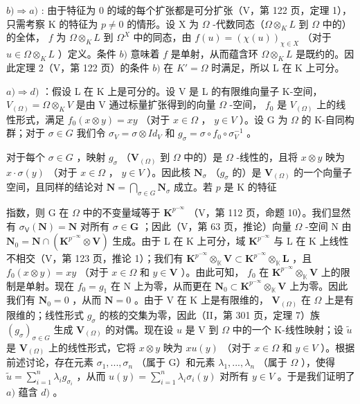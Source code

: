 \(b) \Rightarrow a)\) : 由于特征为 0 的域的每个扩张都是可分扩张（V，第 122 页，定理 1），只需考察 K 的特征为 \(p \neq 0\) 的情形。设 X 为 \(\Omega\) -代数同态（\(\Omega \otimes_{K} L\) 到 \(\Omega\) 中的）的全体， \(f\) 为 \(\Omega \otimes_{K} L\) 到 \(\Omega^{X}\) 中的同态，由 \(f(u) = (\chi(u))_{\chi \in X}\) （对于 \(u \in \Omega \otimes_{K} L\) ）定义。条件 \(b)\) 意味着 \(f\) 是单射，从而蕴含环 \(\Omega \otimes_{K} L\) 是既约的。因此定理 2（V，第 122 页）的条件 \(b)\) 在 \(K' = \Omega\) 时满足，所以 L 在 K 上可分。

\(a) \Rightarrow d)\) ：假设 L 在 K 上是可分的。设 V 是 L 的有限维向量子 K-空间， \(V_{(\Omega)} = \Omega \otimes_K V\) 是由 V 通过标量扩张得到的向量 \(\Omega\) -空间， \(f_0\) 是 \(V_{(\Omega)}\) 上的线性形式，满足 \(f_0(x \otimes y) = xy\) （对于 \(x \in \Omega\) ， \(y \in V\) ）。设 G 为 \(\Omega\) 的 K-自同构群；对于 \(\sigma \in G\) 我们令 \(\sigma_V = \sigma \otimes Id_V\) 和 \(g_\sigma = \sigma \circ f_0 \circ \sigma_V^{-1}\) 。

对于每个 \(\sigma \in G\) ，映射 \(g_{\sigma}\) （\(\mathbf{V}_{(\Omega)}\) 到 \(\Omega\) 中的）是 \(\Omega\) -线性的，且将 \(x \otimes y\) 映为 \(x \cdot \sigma(y)\) （对于 \(x \in \Omega\) ， \(y \in V\) ）。因此核 \(\mathbf{N}_{\sigma}\) （\(g_{\sigma}\) 的）是 \(\mathbf{V}_{(\Omega)}\) 的一个向量子空间，且同样的结论对 \(\mathbf{N} = \bigcap_{\sigma \in G} \mathbf{N}_{\sigma}\) 成立。若 \(p\) 是 K 的特征

指数，则 G 在 \(\Omega\) 中的不变量域等于 \(\mathbf{K}^{p^{-\infty}}\) （V，第 112 页，命题 10）。我们显然有 \(\sigma_{\mathsf{V}}(\mathbf{N}) = \mathbf{N}\) 对所有 \(\sigma \in \mathbf{G}\) ；因此（V，第 63 页，推论）向量 \(\Omega\) -空间 N 由 \(\mathbf{N}_0 = \mathbf{N} \cap (\mathbf{K}^{p^{-\infty}} \otimes \mathbf{V})\) 生成。由于 L 在 K 上可分，域 \(\mathbf{K}^{p^{-\infty}}\) 与 L 在 K 上线性不相交（V，第 123 页，推论 1）；我们有 \(\mathbf{K}^{p^{-\infty}} \otimes_{\mathbb{K}} \mathbf{V} \subset \mathbf{K}^{p^{-\infty}} \otimes_{\mathbb{K}} \mathbf{L}\) ，且 \(f_0(x \otimes y) = xy\) （对于 \(x \in \Omega\) 和 \(y \in \mathbf{V}\) ）。由此可知， \(f_0\) 在 \(\mathbf{K}^{p^{-\infty}} \otimes_{\mathbb{K}} \mathbf{V}\) 上的限制是单射。现在 \(f_0 = g_1\) 在 N 上为零，从而更在 \(\mathbf{N}_0 \subset \mathbf{K}^{p^{-\infty}} \otimes_{\mathbb{K}} \mathbf{V}\) 上为零。因此我们有 \(\mathbf{N}_0 = 0\) ，从而 \(\mathbf{N} = 0\) 。由于 V 在 K 上是有限维的， \(\mathbf{V}_{(\Omega)}\) 在 \(\Omega\) 上是有限维的；线性形式 \(g_\sigma\) 的核的交集为零，因此（II，第 301 页，定理 7）族 \((g_\sigma)_{\sigma \in G}\) 生成 \(\mathbf{V}_{(\Omega)}\) 的对偶。现在设 \(u\) 是 V 到 \(\Omega\) 中的一个 K-线性映射；设 \(\tilde{u}\) 是 \(\mathbf{V}_{(\Omega)}\) 上的线性形式，它将 \(x \otimes y\) 映为 \(x u(y)\) （对于 \(x \in \Omega\) 和 \(y \in V\) ）。根据前述讨论，存在元素 \(\sigma_1, ..., \sigma_n\) （属于 G）和元素 \(\lambda_1, ..., \lambda_n\) （属于 \(\Omega\) ），使得 \(\tilde{u} = \sum_{i=1}^{n} \lambda_i g_{\sigma_i}\) ，从而 \(u(y) = \sum_{i=1}^{n} \lambda_i \sigma_i(y)\) 对所有 \(y \in V\) 。于是我们证明了 \(a)\) 蕴含 \(d)\) 。

